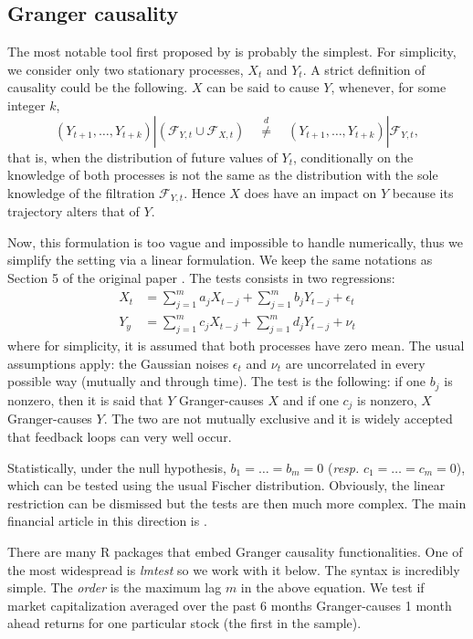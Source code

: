 \documentclass[]{krantz}
\theoremstyle{definition}
\theoremstyle{definition}
\theoremstyle{definition}
\theoremstyle{remark}
\begin{document}
\hypertarget{granger}{%
\subsection{Granger causality}\label{granger}}

The most notable tool first proposed by \citet{granger1969investigating}
is probably the simplest. For simplicity, we consider only two
stationary processes, \(X_t\) and \(Y_t\). A strict definition of
causality could be the following. \(X\) can be said to cause \(Y\),
whenever, for some integer \(k\),
\[(Y_{t+1},\dots,Y_{t+k})|(\mathcal{F}_{Y,t}\cup \mathcal{F}_{X,t}) \quad  \overset{d}{\neq} \quad (Y_{t+1},\dots,Y_{t+k})|\mathcal{F}_{Y,t},\]
that is, when the distribution of future values of \(Y_t\),
conditionally on the knowledge of both processes is not the same as the
distribution with the sole knowledge of the filtration
\(\mathcal{F}_{Y,t}\). Hence \(X\) does have an impact on \(Y\) because
its trajectory alters that of \(Y\).

Now, this formulation is too vague and impossible to handle numerically,
thus we simplify the setting via a linear formulation. We keep the same
notations as Section 5 of the original paper
\citet{granger1969investigating}. The tests consists in two regressions:
\begin{align*}
X_t&=\sum_{j=1}^ma_jX_{t-j}+\sum_{j=1}^mb_jY_{t-j} + \epsilon_t \\
Y_y&=\sum_{j=1}^mc_jX_{t-j}+\sum_{j=1}^md_jY_{t-j} + \nu_t
\end{align*} where for simplicity, it is assumed that both processes
have zero mean. The usual assumptions apply: the Gaussian noises
\(\epsilon_t\) and \(\nu_t\) are uncorrelated in every possible way
(mutually and through time). The test is the following: if one \(b_j\)
is nonzero, then it is said that \(Y\) Granger-causes \(X\) and if one
\(c_j\) is nonzero, \(X\) Granger-causes \(Y\). The two are not mutually
exclusive and it is widely accepted that feedback loops can very well
occur.

Statistically, under the null hypothesis, \(b_1=\dots=b_m=0\)
(\emph{resp.} \(c_1=\dots=c_m=0\)), which can be tested using the usual
Fischer distribution. Obviously, the linear restriction can be dismissed
but the tests are then much more complex. The main financial article in
this direction is \citet{hiemstra1994testing}.

There are many R packages that embed Granger causality functionalities.
One of the most widespread is \emph{lmtest} so we work with it below.
The syntax is incredibly simple. The \emph{order} is the maximum lag
\(m\) in the above equation. We test if market capitalization averaged
over the past 6 months Granger-causes 1 month ahead returns for one
particular stock (the first in the sample).
\end{document}
